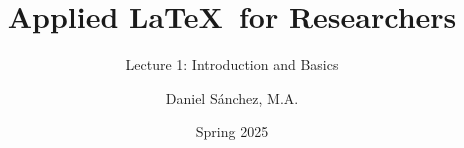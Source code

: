 \documentclass[t,12pt,xcolor=dvipsnames]{beamer}
\title[Applied \LaTeX]{Applied \LaTeX \ for Researchers}
\subtitle{Lecture 1: Introduction and Basics}
\author{Daniel Sánchez, M.A.}
\institute[LIDE]{Laboratorio de Investigación para el Desarrollo del Ecuador}
\date{Spring 2025}
\begin{document}
\begin{frame}
\titlepage
\end{frame}
\end{document}
